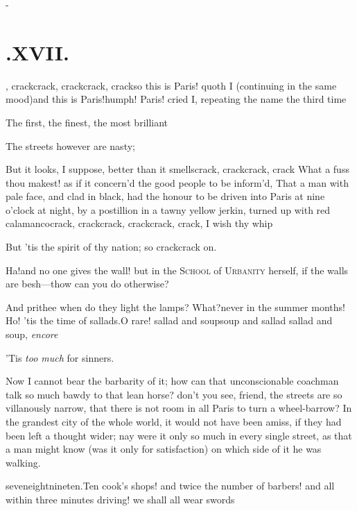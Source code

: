 \documentclass{article}
\begin{document}
\vfill{}\eject
\null\kern-\baselineskip
\section{.\enspace XVII.}

, crack\tsh crack, crack\break\tsh crack, crack\tsk so this is Paris!  quoth I
(continuing in the same mood)\tsk and this is Paris!\tsh humph!\break
\tsh Paris! cried I, repeating the name the third time\tsh

The first, the finest, the most brilliant\tsh

\tsk The streets however are nasty;

But it looks, I suppose, better than it smells\tsh crack, crack\tsh crack, crack\tsh
What a fuss thou makest!\tsk\break
as if it concern’d the good people to be inform’d, That a
man with pale face, and clad in black, had the honour to be driven into Paris at nine
o’clock at night, by a postillion in a tawny yellow jerkin, turned up with red
calamanco\tsk crack, crack\tsh crack, crack\tsh crack, crack,\break
\tsh I wish thy whip\tsh

\tsh But ’tis the spirit of thy nation; so crack\tsk crack on.

Ha!\tsh and no one gives the wall!\break
\tsh but in the \textsc{School} of \textsc{Urbanity}\break
herself, if the walls are besh—t\tsk how can you do otherwise?

And prithee when do they light the lamps? What?\tsk never in the summer months!\tsh
Ho!  ’tis the time of sallads.\break\tsh O rare! sallad and soup\tsk soup and sallad\tsk
sallad and soup, \textit{encore}\tsh{}

\tsh ’Tis \textit{too much} for sinners.

Now I cannot bear the barbarity of it;\break
how can that unconscionable coachman talk so much bawdy to that lean horse?\break
don’t you see, friend, the streets are so villanously narrow, that there is not room in
all Paris to turn a wheel-barrow?\break
In the grandest city of the whole world, it would
not have been amiss, if they had been left a thought wider; nay were it only so
much in every single street, as that a man might know (was it only for satisfaction)
on which side of it he was walking.

\noindent
{}\break
seven\tsk eight\tsk nine\tsk ten.\tsk Ten cook’s
shops! and twice the number of barbers! and all within three minutes driving!
we shall all wear swords\tsh
\end{document}
